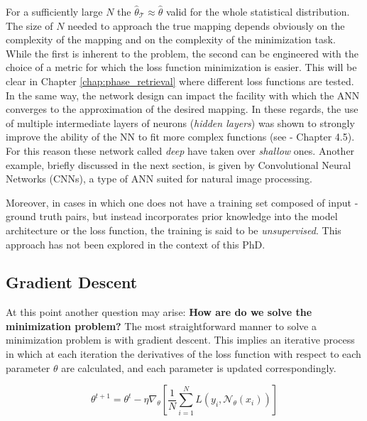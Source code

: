 For a sufficiently large $N$ the $\hat{\theta}_{\mathcal T} \approx \hat{\theta}$ valid for the whole statistical distribution. 
The size of $N$ needed to approach the true mapping depends obviously on the complexity of the mapping and on the 
complexity of the minimization task. While the first is inherent to the problem, the second can be engineered with 
the choice of a metric for which the loss function minimization is easier. This will be clear in Chapter \ref{chap:phase_retrieval}
where different loss functions are tested. In the same way, the network design can impact the facility with which the 
ANN converges to the approximation of the desired mapping. In these regards, the use of multiple intermediate layers 
of neurons (\textit{hidden layers}) was shown to strongly improve the ability of the NN to fit more complex functions
(see \cite{prince2023understanding} - Chapter 4.5). 
For this reason these network called \textit{deep} have taken over \textit{shallow} ones. Another example, briefly 
discussed in the next section, is given by Convolutional Neural Networks (CNNs), a type of ANN suited for natural image 
processing.  

Moreover, in cases in which one does not have a training set composed of input - ground truth pairs, but instead 
incorporates prior knowledge into the model architecture or the loss function, the training is said to be 
\textit{unsupervised}. This approach has not been explored in the context of this PhD. 

\subsection{Gradient Descent}

At this point another question may arise: \textbf{How are do we solve the minimization problem?}
The most straightforward manner to solve a minimization problem is with gradient descent. This implies an iterative process 
in which at each iteration the derivatives of the loss function with respect to each parameter $\theta$ are calculated, 
and each parameter is updated correspondingly. 

\begin{equation}
    \theta^{t+1}
    = \theta^{t} - \eta \nabla_{\theta} \left[ \frac{1}{N} \sum_{i=1}^N 
    L\!\left(y_i, \mathcal{N}_\theta(x_i)\right) \right]
    \label{eq:steepest_gd}
\end{equation}

